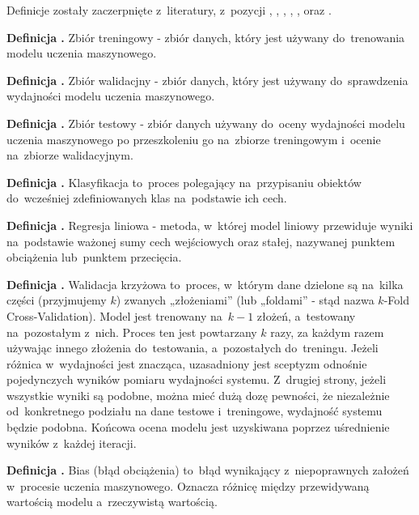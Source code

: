 Definicje zostały zaczerpnięte z~literatury, z~pozycji \cite{Fenner2020}, \cite{Geron2020},
\cite{Seenappa} , \cite{Goodfellow2016}, \cite{vanDerMaaten}, \cite{strGoogle} oraz \cite{strIbm}.

\noindent
\textbf{Definicja .}
\incrementdefinitionIndex
Zbiór treningowy - zbiór danych, który jest używany do~trenowania modelu uczenia maszynowego.

\noindent
\textbf{Definicja .}
\incrementdefinitionIndex
Zbiór walidacjny - zbiór danych, który jest używany do~sprawdzenia wydajności modelu uczenia maszynowego.

\noindent
\textbf{Definicja .}
\incrementdefinitionIndex
Zbiór testowy - zbiór danych używany do~oceny wydajności modelu uczenia maszynowego
po przeszkoleniu go na~zbiorze treningowym i~ocenie na~zbiorze walidacyjnym.

\noindent
\textbf{Definicja .}
\incrementdefinitionIndex
Klasyfikacja to~proces polegający na~przypisaniu obiektów do~wcześniej zdefiniowanych klas na~podstawie ich cech.

\noindent
\textbf{Definicja .}
\incrementdefinitionIndex
Regresja liniowa - metoda, w~której model liniowy przewiduje wyniki na~podstawie ważonej sumy cech wejściowych oraz stałej,
nazywanej punktem obciążenia lub~punktem przecięcia.

\noindent
\textbf{Definicja .}
\incrementdefinitionIndex
Walidacja krzyżowa to~proces, w~którym dane dzielone są na~kilka części (przyjmujemy $k$) zwanych „złożeniami”
(lub „foldami” - stąd nazwa $k$-Fold Cross-Validation). Model jest trenowany na~$k-1$ złożeń, a~testowany na~pozostałym z~nich.
Proces ten jest powtarzany $k$ razy, za każdym razem używając innego złożenia do~testowania, a~pozostałych do~treningu.
Jeżeli różnica w~wydajności jest znacząca, uzasadniony jest sceptyzm odnośnie pojedynczych wyników pomiaru wydajności systemu.
Z~drugiej strony, jeżeli wszystkie wyniki są podobne, można mieć dużą dozę pewności, że niezależnie od~konkretnego podziału
na dane testowe i~treningowe, wydajność systemu będzie podobna.
Końcowa ocena modelu jest uzyskiwana poprzez uśrednienie wyników z~każdej iteracji.

\noindent
\textbf{Definicja .}
\incrementdefinitionIndex
Bias (błąd obciążenia) to~błąd wynikający z~niepoprawnych założeń w~procesie uczenia maszynowego.
Oznacza różnicę między przewidywaną wartością modelu a~rzeczywistą wartością.

